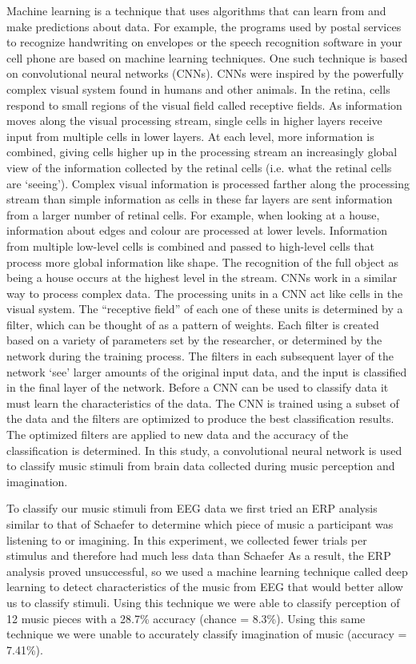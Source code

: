 Machine learning is a technique that uses algorithms that can learn from and make predictions about data.
For example, the programs used by postal services to recognize handwriting on envelopes or the speech recognition software in your cell phone are based on machine learning techniques.
One such technique is based on convolutional neural networks (\acp{CNN}).
\acp{CNN} were inspired by the powerfully complex visual system found in humans and other animals.
In the retina, cells respond to small regions of the visual field \cite{hubel_receptive_1963} called receptive fields. 
As information moves along the visual processing stream, single cells in higher layers receive input from multiple cells in lower layers.
At each level, more information is combined, giving cells higher up in the processing stream an increasingly global view of the information collected by the retinal cells (i.e. what the retinal cells are `seeing').
Complex visual information is processed farther along the processing stream than simple information as cells in these far layers are sent information from a larger number of retinal cells.
For example, when looking at a house, information about edges and colour are processed at lower levels.
Information from multiple low-level cells is combined and passed to high-level cells that process more global information like shape. 
The recognition of the full object as being a house occurs at the highest level in the stream. 
\acp{CNN} work in a similar way to process complex data. 
The processing units in a \ac{CNN} act like cells in the visual system.
The ``receptive field'' of each one of these units is determined by a filter, which can be thought of as a pattern of weights.
Each filter is created based on a variety of parameters set by the researcher, or determined by the network during the training process.
The filters in each subsequent layer of the network `see' larger amounts of the original input data, and the input is classified in the final layer of the network. 
Before a \ac{CNN} can be used to classify data it must learn the characteristics of the data. 
The \ac{CNN} is trained using a subset of the data and the filters are optimized to produce the best classification results. 
The optimized filters are applied to new data and the accuracy of the classification is determined. 
In this study, a convolutional neural network is used to classify music stimuli from brain data collected during music perception and imagination. 

To classify our music stimuli from EEG data we first tried an ERP analysis similar to that of Schaefer \etal\citeyear{schaefer_name_2011} to determine which piece of music a participant was listening to or imagining.
In this experiment, we collected fewer trials per stimulus and therefore had much less data than Schaefer \etal
As a result, the ERP analysis proved unsuccessful, so we used a machine learning technique called deep learning to detect characteristics of the music from EEG that would better allow us to classify stimuli.
Using this technique we were able to classify perception of 12 music pieces with a 28.7\% accuracy (chance = 8.3\%).
Using this same technique we were unable to accurately classify imagination of music (accuracy = 7.41\%). 